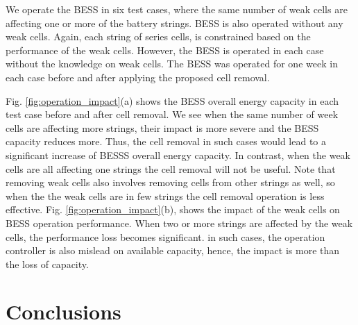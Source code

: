 \documentclass[10pt,twocolumn]{IEEEtran}
\begin{document}
We operate the BESS in six  test cases, where the same number of weak cells are affecting  one  or more of the battery strings. %
 BESS is also operated without any weak cells.
Again, each string of series cells, is constrained based on the performance of the weak cells.
However, the BESS is operated in each case without the knowledge on weak cells. 
The BESS was operated for one week in each case before and after applying the proposed cell removal.
%

Fig. \ref{fig:operation_impact}(a) shows the BESS overall energy capacity in each test case before and after cell removal.
We see when the same number of week cells are affecting more strings, their impact is more severe and the BESS capacity reduces more.
Thus, the cell removal in such  cases would lead to a significant increase of BESSS overall energy capacity.
In contrast, when the weak cells are all affecting one strings the cell removal will not be useful.
 Note that removing weak cells also involves removing cells from other strings as well, so when the the weak cells are in few strings the cell removal operation is less effective. 
Fig. \ref{fig:operation_impact}(b), shows the impact of the weak cells  on BESS  operation performance.
  When two or more  strings are affected by the weak cells, the performance loss becomes significant. 
  in such cases, the operation controller  is also mislead on available capacity, hence,  the impact is more than the loss of  capacity.



\vspace{-0.3cm}

\section{Conclusions}
\end{document}
